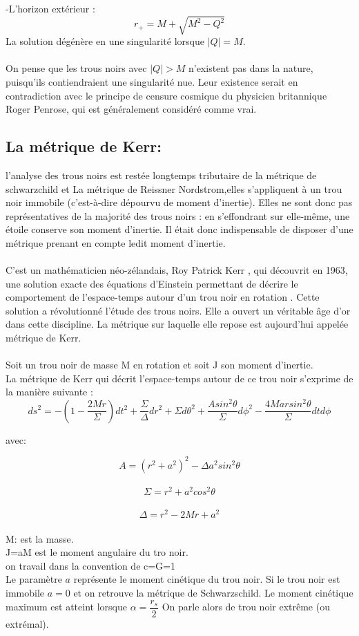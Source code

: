 \documentclass[12pt,  a4paper, openright]{report} %
\begin{document}
-L’horizon extérieur :
\begin{equation}
r_{+} = M + \sqrt{M^{2}-Q^{2}}
\end{equation}
La solution dégénère en une singularité lorsque  $|Q|=M$.\\
\\
On pense que les trous noirs avec $ |Q|>M$ n'existent pas dans la nature, puisqu'ils contiendraient une singularité nue. Leur existence serait en contradiction avec le principe de censure cosmique du physicien britannique Roger Penrose, qui est généralement considéré comme vrai.
\subsection{La métrique de Kerr:}
l'analyse des trous noirs est restée longtemps tributaire de la métrique de schwarzchild et La métrique de Reissner Nordstrom,elles s'appliquent à un trou noir immobile (c’est-à-dire dépourvu de moment d’inertie). Elles ne sont donc pas représentatives de la majorité des trous noirs : en s’effondrant sur elle-même, une étoile conserve son moment d’inertie. Il était donc indispensable de disposer d’une métrique prenant en compte ledit moment d’inertie.\\
\\
C’est un mathématicien néo-zélandais, Roy Patrick Kerr , qui découvrit en 1963, une solution exacte des équations d’Einstein permettant de décrire le comportement de l’espace-temps autour d’un trou noir en rotation \cite{1}. Cette solution a révolutionné l’étude des trous noirs. Elle a ouvert un véritable âge d’or dans cette discipline. La métrique sur laquelle elle repose est aujourd’hui appelée métrique de Kerr.\\
\\
Soit un trou noir de masse M en rotation et soit J son moment d’inertie.\\

La métrique de Kerr qui décrit l’espace-temps autour de ce trou noir s’exprime de la manière suivante :
\begin{equation}
ds^{2}=-(1-\dfrac{2Mr}{\Sigma})dt^{2}+\dfrac{\Sigma}{\Delta}dr^{2}+\Sigma d\theta^{2}+\dfrac{Asin^{2}\theta}{\Sigma} d\phi^{2}-\dfrac{4Marsin^{2}\theta }{\Sigma} dt d\phi
\end{equation}

avec:

$$A=(r^{2}+a^{2})^{2}-\Delta a^{2}sin^{2}\theta$$
\\
$$\Sigma =r^{2}+a^{2}cos^{2}\theta$$
\\
$$\Delta=r^{2}-2Mr+a^{2}$$
\\
M: est la masse.\\
J=aM est le moment angulaire du tro noir.\\ on travail dans la convention de c=G=1\\
Le paramètre $a$ représente le moment cinétique du trou noir. Si le trou noir est immobile $ a= 0 $ et on retrouve la métrique de Schwarzschild. Le moment cinétique maximum est atteint lorsque $\alpha=\dfrac{r_{s}}{2}$ On parle alors de trou noir extrême (ou extrémal).
\end{document}
